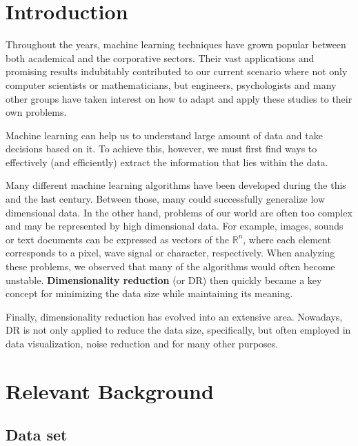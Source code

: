 \documentclass[12pt]{report}
\begin{document}
\newpage
\tableofcontents

\newpage
\listoffigures
\newpage

\listoftables

\newpage
{} 

\chapter{Introduction}

Throughout the years, machine learning techniques have grown popular between both academical and the corporative sectors. Their vast applications and promising results \cite{brownlee} indubitably contributed to our current scenario where not only computer scientists or mathematicians, but engineers, psychologists and many other groups have taken interest \cite{baldi2001bioinformatics} on how to adapt and apply these studies to their own problems.

Machine learning can help us to understand large amount of data and take decisions based on it. To achieve this, however, we must first find ways to effectively (and efficiently) extract the information that lies within the data.

Many different machine learning algorithms have been developed during the this and the last century. Between those, many could successfully generalize low dimensional data. \cite{wang2012geometric} In the other hand, problems of our world are often too complex and may be represented by high dimensional data. For example, images, sounds or text documents can be expressed as vectors of the $\mathbb{R}^n$, where each element corresponds to a pixel, wave signal or character, respectively. When analyzing these problems, we observed that many of the algorithms would often become unstable. \textbf{Dimensionality reduction} (or DR) then quickly became a key concept for minimizing the data size while maintaining its meaning.

Finally, dimensionality reduction has evolved into an extensive area. Nowadays, DR is not only applied to reduce the data size, specifically, but often employed in data visualization, noise reduction and for many other purposes.

\newpage

\chapter{Relevant Background}
\section{Data set}
\end{document}
